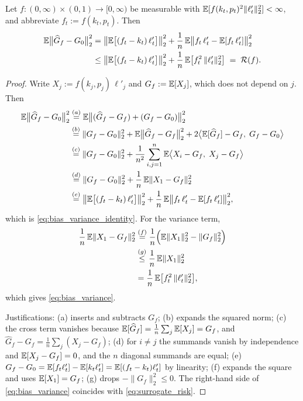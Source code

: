 \begin{lemma}
\label{lem:bias_variance}
Let $f:(0,\infty)\times(0,1)\to[0,\infty)$ be measurable with
$\mathbb{E}[f(k_t,p_t)^2\|\ell'_t\|_2^2]<\infty$, and abbreviate $f_t:=f(k_t,p_t)$. Then
\begin{align}
\mathbb{E}\big\|\widehat G_f-G_0\big\|_2^2
&= \big\|\mathbb{E}\big[(f_t-k_t)\,\ell'_t\big]\big\|_2^2
+\frac1n\,\mathbb{E}\big\|f_t\,\ell'_t-\mathbb{E}[f_t\,\ell'_t]\big\|_2^2
\label{eq:bias_variance_identity}\\
&\le \big\|\mathbb{E}\big[(f_t-k_t)\,\ell'_t\big]\big\|_2^2
+\frac1n\,\mathbb{E}\big[f_t^2\,\|\ell'_t\|_2^2\big]
\;=\;\mathcal R(f).
\label{eq:bias_variance}
\end{align}
\end{lemma}

\begin{proof}
Write $X_j:=f(k_j,p_j)\,\ell'_j$ and $G_f:=\mathbb{E}[X_j]$, which does not depend on
$j$. Then
\begin{align*}
\mathbb{E}\big\|\widehat G_f-G_0\big\|_2^2
&\overset{(a)}{=} \mathbb{E}\big\|(\widehat G_f-G_f)+(G_f-G_0)\big\|_2^2\\
&\overset{(b)}{=} \|G_f-G_0\|_2^2
+\mathbb{E}\big\|\widehat G_f-G_f\big\|_2^2
+2\big\langle\mathbb{E}[\widehat G_f]-G_f,\;G_f-G_0\big\rangle\\
&\overset{(c)}{=} \|G_f-G_0\|_2^2
+\frac{1}{n^2}\sum_{i,j=1}^{n}\mathbb{E}\big\langle X_i-G_f,\;X_j-G_f\big\rangle\\
&\overset{(d)}{=} \|G_f-G_0\|_2^2
+\frac1n\,\mathbb{E}\|X_1-G_f\|_2^2\\
&\overset{(e)}{=} \big\|\mathbb{E}\big[(f_t-k_t)\,\ell'_t\big]\big\|_2^2
+\frac1n\,\mathbb{E}\big\|f_t\,\ell'_t-\mathbb{E}[f_t\,\ell'_t]\big\|_2^2 ,
\end{align*}
which is \eqref{eq:bias_variance_identity}. For the variance term,
\begin{align*}
\frac1n\,\mathbb{E}\|X_1-G_f\|_2^2
&\overset{(f)}{=} \frac1n\Big(\mathbb{E}\|X_1\|_2^2-\|G_f\|_2^2\Big)\\
&\overset{(g)}{\le} \frac1n\,\mathbb{E}\|X_1\|_2^2\\
&= \frac1n\,\mathbb{E}\big[f_t^2\,\|\ell'_t\|_2^2\big],
\end{align*}
which gives \eqref{eq:bias_variance}.

Justifications: (a) inserts and subtracts $G_f$; (b) expands the squared norm;
(c) the cross term vanishes because $\mathbb{E}[\widehat G_f]=\frac1n\sum_j\mathbb{E}[X_j]=G_f$,
and $\widehat G_f-G_f=\frac1n\sum_{j}(X_j-G_f)$; (d) for $i\neq j$ the
summands vanish by independence and $\mathbb{E}[X_j-G_f]=0$, and the $n$ diagonal
summands are equal; (e) $G_f-G_0=\mathbb{E}[f_t\ell'_t]-\mathbb{E}[k_t\ell'_t]
=\mathbb{E}[(f_t-k_t)\ell'_t]$ by linearity; (f) expands the square and uses
$\mathbb{E}[X_1]=G_f$; (g) drops $-\|G_f\|_2^2\le0$. The right-hand side of
\eqref{eq:bias_variance} coincides with \eqref{eq:surrogate_risk}.
\end{proof}

